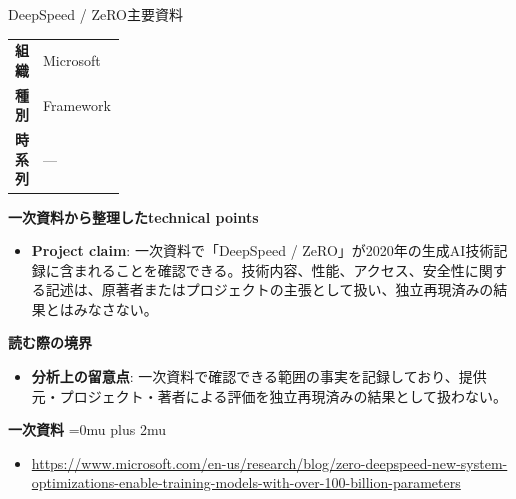\begin{technicalnote}{DeepSpeed / ZeRO}{主要資料}
\begingroup
\begin{tabularx}{\linewidth}{@{}>{\bfseries}p{0.22\linewidth}X@{}}
組織 & Microsoft \\
種別 & Framework \\
時系列 & — \\
\end{tabularx}
\smallskip
{\bfseries 一次資料から整理したtechnical points}
\begin{itemize}[leftmargin=1.5em,itemsep=0.35em]
\item \textbf{Project claim}: 一次資料で「DeepSpeed / ZeRO」が2020年の生成AI技術記録に含まれることを確認できる。技術内容、性能、アクセス、安全性に関する記述は、原著者またはプロジェクトの主張として扱い、独立再現済みの結果とはみなさない。
\end{itemize}
\begin{minipage}{\linewidth}
{\bfseries 読む際の境界}
\begin{itemize}[leftmargin=1.5em,itemsep=0.35em]
\item \textbf{分析上の留意点}: 一次資料で確認できる範囲の事実を記録しており、提供元・プロジェクト・著者による評価を独立再現済みの結果として扱わない。
\end{itemize}
\begin{samepage}
{\bfseries 一次資料}
\begingroup\sloppy
\Urlmuskip=0mu plus 2mu\relax
\begin{itemize}[leftmargin=1.5em,itemsep=0.25em]
\item {\scriptsize\url{https://www.microsoft.com/en-us/research/blog/zero-deepspeed-new-system-optimizations-enable-training-models-with-over-100-billion-parameters}}
\end{itemize}
\endgroup
\end{samepage}
\end{minipage}
\endgroup
\end{technicalnote}
\medskip

